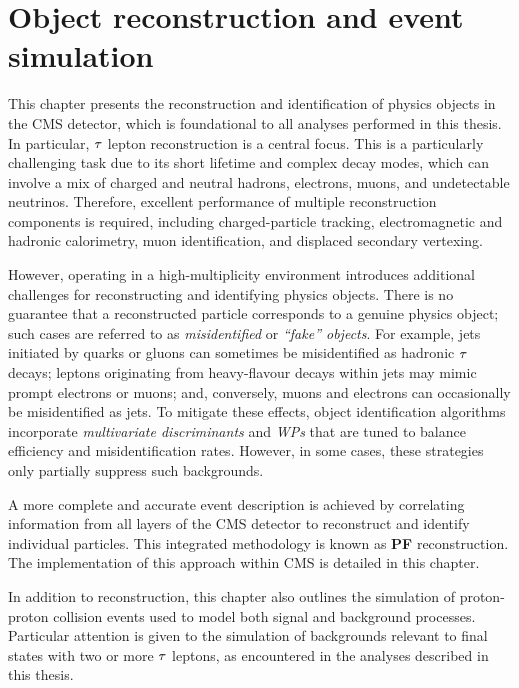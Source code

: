 \chapter{Object reconstruction and event simulation}
\thispagestyle{plain}  %
\pagestyle{chapterpages}
\label{Section:Chapter4}
\minitoc

This chapter presents the reconstruction and identification of physics objects in the CMS detector, which is foundational to all analyses performed in this thesis. In particular, $\tau$ lepton reconstruction is a central focus. This is a particularly challenging task due to its short lifetime and complex decay modes, which can involve a mix of charged and neutral hadrons, electrons, muons, and undetectable neutrinos. Therefore, excellent performance of multiple reconstruction components is required, including charged-particle tracking, electromagnetic and hadronic calorimetry, muon identification, and displaced secondary vertexing.

However, operating in a high-multiplicity environment introduces additional challenges for reconstructing and identifying physics objects. There is no guarantee that a reconstructed particle corresponds to a genuine physics object; such cases are referred to as \textit{misidentified} or \textit{``fake'' objects}. For example, jets initiated by quarks or gluons can sometimes be misidentified as hadronic $\tau$ decays; leptons originating from heavy-flavour decays within jets may mimic prompt electrons or muons; and, conversely, muons and electrons can occasionally be misidentified as jets. To mitigate these effects, object identification algorithms incorporate \textit{multivariate discriminants} and \textit{\acp{WP}} that are tuned to balance efficiency and misidentification rates. However, in some cases, these strategies only partially suppress such backgrounds.

A more complete and accurate event description is achieved by correlating information from all layers of the CMS detector to reconstruct and identify individual particles. This integrated methodology is known as \textbf{\ac{PF}} reconstruction. The implementation of this approach within CMS is detailed in this chapter.

In addition to reconstruction, this chapter also outlines the simulation of proton-proton collision events used to model both signal and background processes. Particular attention is given to the simulation of backgrounds relevant to final states with two or more $\tau$ leptons, as encountered in the analyses described in this thesis.

